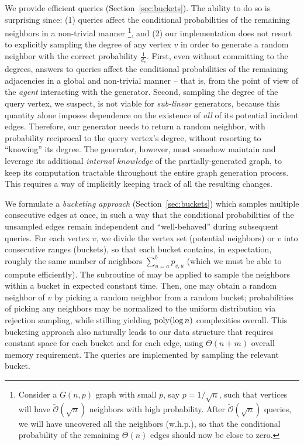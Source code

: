 We provide efficient  queries (Section~\ref{sec:buckets}).
The ability to do so is surprising since:
(1)  queries affect the conditional probabilities of the remaining neighbors in a non-trivial manner
\footnote{\label{conditional}Consider a $G(n,p)$ graph with small $p$, say $p = 1/\sqrt n$,
such that vertices will have $\tilde{\mathcal{O}}(\sqrt n)$ neighbors with high probability.
After $\tilde{\mathcal{O}}(\sqrt n)$  queries, we will have uncovered all the neighbors (w.h.p.),
so that the conditional probability of the remaining $\Theta(n)$ edges should now be close to zero.}, and
(2) our implementation does not resort to explicitly sampling the degree of any vertex $v$
in order to generate a random neighbor with the correct probability $\frac{1}{d_v}$.
First, even without committing to the degrees, answers to  queries
affect the conditional probabilities of the remaining adjacencies in a global and non-trivial manner 
-- that is, from the point of view of the \emph{agent} interacting with the generator.
Second, sampling the degree of the query vertex, we suspect, is not viable for \emph{sub-linear} generators,
because this quantity alone imposes dependence on the existence of \emph{all} of its potential incident edges.
Therefore, our generator needs to return a random neighbor, with probability reciprocal to the query vertex's degree,
without resorting to ``knowing'' its degree.
The generator, however, must somehow maintain and leverage its additional \emph{internal knowledge}
of the partially-generated graph, to keep its computation tractable throughout the entire graph generation process.
This requires a way of implicitly keeping track of all the resulting changes.

We formulate a {\em bucketing approach} (Section~\ref{sec:buckets})
which samples multiple consecutive edges at once, in such a way
that the conditional probabilities of the unsampled edges
remain independent and ``well-behaved'' during subsequent queries.
For each vertex $v$, we divide the vertex set (potential neighbors) or $v$ into consecutive ranges (buckets),
so that each bucket contains, in expectation, roughly the same number of neighbors
$\sum^{b}_{u=a} p_{v,u}$ (which we must be able to compute efficiently).
The subroutine of  may be applied to sample the neighbors within a bucket in expected constant time.
Then, one may obtain a random neighbor of $v$ by picking a random neighbor from a random bucket;
probabilities of picking any neighbors may be normalized to the uniform distribution via rejection sampling,
while stilling yielding $\mathrm{poly}(\log n)$ complexities overall.
This bucketing approach also naturally leads to our data structure that requires
constant space for each bucket and for each edge, using $\Theta(n+m)$ overall memory requirement.
The  queries are implemented by sampling the relevant bucket.

